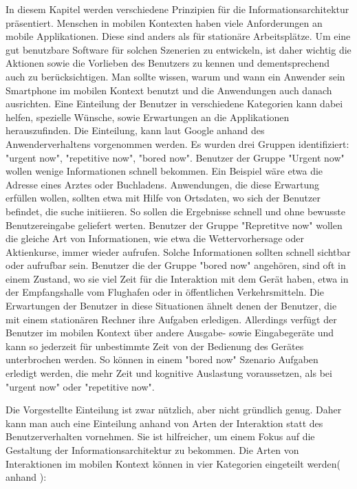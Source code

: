 In diesem Kapitel werden verschiedene Prinzipien für die Informationsarchitektur präsentiert.
Menschen in mobilen Kontexten haben viele Anforderungen an mobile Applikationen. Diese sind anders als für stationäre Arbeitsplätze. Um eine gut benutzbare Software für solchen Szenerien zu entwickeln, ist daher wichtig die Aktionen sowie die Vorlieben des Benutzers zu kennen und dementsprechend auch zu berücksichtigen. Man sollte wissen, warum und wann ein Anwender sein Smartphone im mobilen Kontext benutzt und die Anwendungen auch danach ausrichten.
Eine Einteilung der Benutzer in verschiedene Kategorien kann dabei helfen, spezielle Wünsche, sowie Erwartungen an die Applikationen herauszufinden.
Die Einteilung, kann laut Google anhand des Anwenderverhaltens vorgenommen werden. Es wurden drei Gruppen identifiziert: "urgent now", "repetitive now", "bored now"\cite{googleUsers}. Benutzer der Gruppe "Urgent now" wollen wenige Informationen schnell bekommen. Ein Beispiel wäre etwa die Adresse eines  Arztes oder Buchladens. Anwendungen, die diese Erwartung erfüllen wollen, sollten etwa mit Hilfe von Ortsdaten, wo sich der Benutzer befindet, die suche initiieren. So sollen die Ergebnisse schnell und ohne bewusste Benutzereingabe geliefert werten. Benutzer der Gruppe "Repretitve now" wollen die gleiche Art von Informationen, wie etwa die Wettervorhersage oder Aktienkurse, immer wieder aufrufen. Solche Informationen sollten schnell sichtbar oder aufrufbar sein. Benutzer die der Gruppe "bored now" angehören, sind oft in einem Zustand, wo sie viel Zeit für die Interaktion mit dem Gerät haben, etwa in der Empfangshalle vom Flughafen oder in öffentlichen Verkehrsmitteln. Die Erwartungen der Benutzer in diese Situationen ähnelt denen der Benutzer, die mit einem stationären Rechner ihre Aufgaben erledigen. Allerdings verfügt der Benutzer im mobilen Kontext über andere Ausgabe- sowie Eingabegeräte und kann so jederzeit für unbestimmte Zeit von der Bedienung des Gerätes unterbrochen werden. So können in einem "bored now" Szenario Aufgaben erledigt werden, die mehr Zeit und kognitive Auslastung voraussetzen, als bei "urgent now" oder "repetitive now".

Die Vorgestellte Einteilung ist zwar nützlich, aber nicht gründlich genug. Daher kann man auch eine Einteilung anhand von Arten der Interaktion statt des Benutzerverhalten vornehmen. Sie ist hilfreicher, um einem Fokus auf die Gestaltung der Informationsarchitektur zu bekommen. Die  Arten von Interaktionen im mobilen Kontext können in vier Kategorien eingeteilt werden( anhand \cite[Seite 50]{mobileFirst}):

